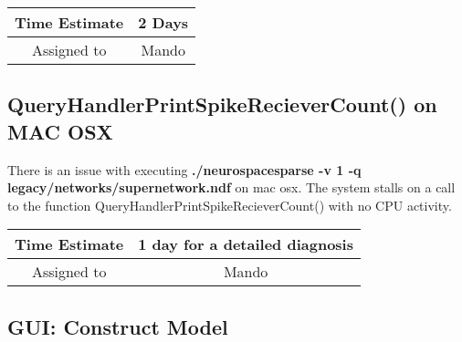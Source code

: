 \documentclass[12pt]{article}
\begin{document}
\begin{center}
  \vspace{5mm}
  \centering
  \begin{tabular}{|c|c|}
    \hline
    Time Estimate
    & 2 Days\\
    \hline
    Assigned to
    & Mando \\
    \hline
  \end{tabular}
\end{center}


\subsection{QueryHandlerPrintSpikeRecieverCount() on MAC OSX}

There is an issue with executing {\bf ./neurospacesparse -v 1 -q
  legacy/networks/supernetwork.ndf} on mac osx. The system stalls on a
call to the function QueryHandlerPrintSpikeRecieverCount() with no CPU
activity.

\begin{center}
  \vspace{5mm}
  \centering
  \begin{tabular}{|c|c|}
    \hline
    Time Estimate
    & 1 day for a detailed diagnosis \\
    \hline
    Assigned to
    & Mando \\
    \hline
  \end{tabular}
\end{center}


\subsection{GUI: Construct Model}
\end{document}

